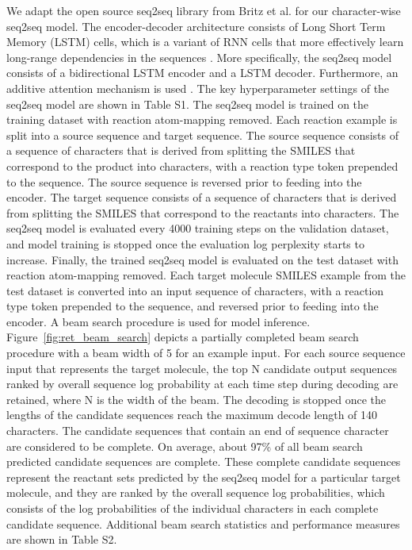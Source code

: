 We adapt the open source seq2seq library from Britz et al. \cite{britz2017massive} for our character-wise seq2seq model. The encoder-decoder architecture consists of Long Short Term Memory (LSTM) cells, which is a variant of RNN cells that more effectively learn long-range dependencies in the sequences \cite{hochreiter1997long}. More specifically, the seq2seq model consists of a bidirectional LSTM encoder and a LSTM decoder. Furthermore, an additive attention mechanism is used \cite{bahdanau2014neural}. The key hyperparameter settings of the seq2seq model are shown in Table S1.
The seq2seq model is trained on the training dataset with reaction atom-mapping removed. Each reaction example is split into a source sequence and target sequence. The source sequence consists of a sequence of characters that is derived from splitting the SMILES that correspond to the product into characters, with a reaction type token prepended to the sequence. The source sequence is reversed prior to feeding into the encoder. The target sequence consists of a sequence of characters that is derived from splitting the SMILES that correspond to the reactants into characters. The seq2seq model is evaluated every 4000 training steps on the validation dataset, and model training is stopped once the evaluation log perplexity starts to increase. 
Finally, the trained seq2seq model is evaluated on the test dataset with reaction atom-mapping removed. Each target molecule SMILES example from the test dataset is converted into an input sequence of characters, with a reaction type token prepended to the sequence, and reversed prior to feeding into the encoder. A beam search procedure is used for model inference. Figure~\ref{fig:ret_beam_search} depicts a partially completed beam search procedure with a beam width of 5 for an example input. For each source sequence input that represents the target molecule, the top N candidate output sequences ranked by overall sequence log probability at each time step during decoding are retained, where N is the width of the beam. The decoding is stopped once the lengths of the candidate sequences reach the maximum decode length of 140 characters. The candidate sequences that contain an end of sequence character are considered to be complete. On average, about 97\% of all beam search predicted candidate sequences are complete. These complete candidate sequences represent the reactant sets predicted by the seq2seq model for a particular target molecule, and they are ranked by the overall sequence log probabilities, which consists of the log probabilities of the individual characters in each complete candidate sequence. Additional beam search statistics and performance measures are shown in Table S2.

